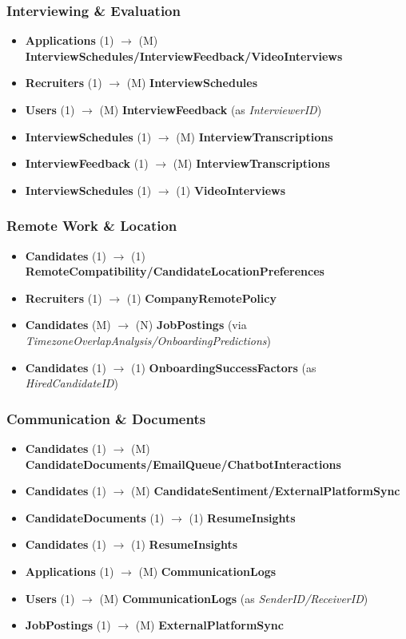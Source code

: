 \documentclass[11pt,a4paper]{article}
\begin{document}
\subsubsection*{Interviewing \& Evaluation}
\begin{itemize}
    \item \textbf{Applications} (1) $\rightarrow$ (M) \textbf{InterviewSchedules/InterviewFeedback/VideoInterviews}
    \item \textbf{Recruiters} (1) $\rightarrow$ (M) \textbf{InterviewSchedules}
    \item \textbf{Users} (1) $\rightarrow$ (M) \textbf{InterviewFeedback} (as \textit{InterviewerID})
    \item \textbf{InterviewSchedules} (1) $\rightarrow$ (M) \textbf{InterviewTranscriptions}
    \item \textbf{InterviewFeedback} (1) $\rightarrow$ (M) \textbf{InterviewTranscriptions}
    \item \textbf{InterviewSchedules} (1) $\rightarrow$ (1) \textbf{VideoInterviews}
\end{itemize}

\subsubsection*{Remote Work \& Location}
\begin{itemize}
    \item \textbf{Candidates} (1) $\rightarrow$ (1) \textbf{RemoteCompatibility/CandidateLocationPreferences}
    \item \textbf{Recruiters} (1) $\rightarrow$ (1) \textbf{CompanyRemotePolicy}
    \item \textbf{Candidates} (M) $\rightarrow$ (N) \textbf{JobPostings} (via \textit{TimezoneOverlapAnalysis/OnboardingPredictions})
    \item \textbf{Candidates} (1) $\rightarrow$ (1) \textbf{OnboardingSuccessFactors} (as \textit{HiredCandidateID})
\end{itemize}

\subsubsection*{Communication \& Documents}
\begin{itemize}
    \item \textbf{Candidates} (1) $\rightarrow$ (M) \textbf{CandidateDocuments/EmailQueue/ChatbotInteractions}
    \item \textbf{Candidates} (1) $\rightarrow$ (M) \textbf{CandidateSentiment/ExternalPlatformSync}
    \item \textbf{CandidateDocuments} (1) $\rightarrow$ (1) \textbf{ResumeInsights}
    \item \textbf{Candidates} (1) $\rightarrow$ (1) \textbf{ResumeInsights}
    \item \textbf{Applications} (1) $\rightarrow$ (M) \textbf{CommunicationLogs}
    \item \textbf{Users} (1) $\rightarrow$ (M) \textbf{CommunicationLogs} (as \textit{SenderID/ReceiverID})
    \item \textbf{JobPostings} (1) $\rightarrow$ (M) \textbf{ExternalPlatformSync}
\end{itemize}
\end{document}
